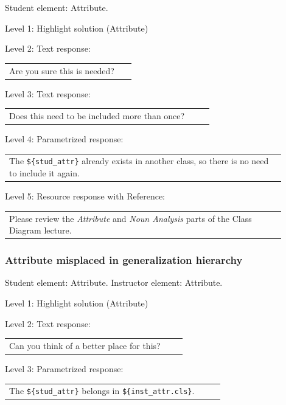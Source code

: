 Student element: Attribute.  \medskip

\noindent Level 1: Highlight solution (Attribute) \medskip

\noindent Level 2: Text response: \medskip

\begin{tabular}{|p{0.9\linewidth}}
Are you sure this is needed?
\end{tabular} \medskip

\noindent Level 3: Text response: \medskip

\begin{tabular}{|p{0.9\linewidth}}
Does this need to be included more than once?
\end{tabular} \medskip

\noindent Level 4: Parametrized response: \medskip

\begin{tabular}{|p{0.9\linewidth}}
The \verb|${stud_attr}| already exists in another class, so there is no need to include it again.
\end{tabular} \medskip

\noindent Level 5: Resource response with Reference: \medskip

\begin{tabular}{|p{0.9\linewidth}}
Please review the \textit{Attribute} and \textit{Noun Analysis} parts of the Class Diagram lecture.
\end{tabular} \medskip


\subsubsection{Attribute misplaced in generalization hierarchy}

Student element: Attribute. Instructor element: Attribute. \medskip

\noindent Level 1: Highlight solution (Attribute) \medskip

\noindent Level 2: Text response: \medskip

\begin{tabular}{|p{0.9\linewidth}}
Can you think of a better place for this?
\end{tabular} \medskip

\noindent Level 3: Parametrized response: \medskip

\begin{tabular}{|p{0.9\linewidth}}
The \verb|${stud_attr}| belongs in \verb|${inst_attr.cls}|.
\end{tabular} \medskip

